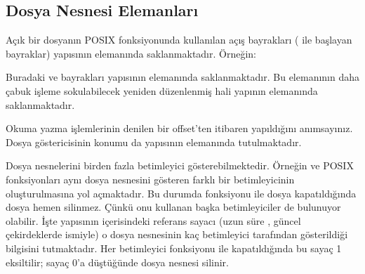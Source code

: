 \documentclass[a4paper,10pt,turkish]{sphinxmanual}
\begin{document}
\subsection{Dosya Nesnesi Elemanları}
\label{\detokenize{filesystem1:dosya-nesnesi-elemanlari}}
\sphinxAtStartPar
Açık bir dosyanın  POSIX fonksiyonunda kullanılan açış bayrakları ( ile başlayan
bayraklar)  yapısının  elemanında saklanmaktadır. Örneğin:

\begin{sphinxVerbatim}[commandchars=\\\{\}]
\end{sphinxVerbatim}

\sphinxAtStartPar
Buradaki  ve  bayrakları  yapısının  elemanında
saklanmaktadır. Bu  elemanının daha çabuk işleme sokulabilecek yeniden düzenlenmiş
hali yapının  elemanında saklanmaktadır.

\sphinxAtStartPar
Okuma yazma işlemlerinin  denilen bir offset’ten itibaren
yapıldığını anımsayınız. Dosya göstericisinin konumu da  yapısının  elemanında
tutulmaktadır.

\sphinxAtStartPar
Dosya nesnelerini birden fazla betimleyici gösterebilmektedir. Örneğin  ve  POSIX
fonksiyonları aynı dosya nesnesini gösteren farklı bir betimleyicinin oluşturulmasına yol
açmaktadır. Bu durumda  fonksiyonu ile dosya kapatıldığında dosya hemen silinmez. Çünkü
onu kullanan başka betimleyiciler de bulunuyor olabilir. İşte  yapısının içerisindeki
referans sayacı (uzun süre , güncel çekirdeklerde  ismiyle) o dosya
nesnesinin kaç betimleyici tarafından gösterildiği bilgisini tutmaktadır. Her betimleyici
 fonksiyonu ile kapatıldığında bu sayaç 1 eksiltilir; sayaç 0’a düştüğünde dosya nesnesi
silinir.
\end{document}
